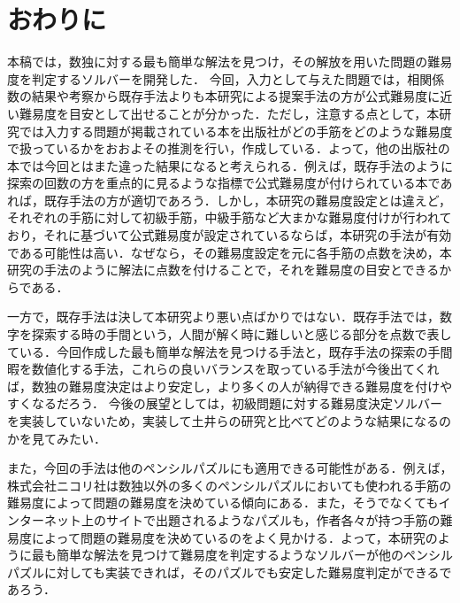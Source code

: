 \documentclass[submit,techrep,noauthor]{ipsj}
\begin{document}
\section{おわりに}
本稿では，数独に対する最も簡単な解法を見つけ，その解放を用いた問題の難易度を判定するソルバーを開発した．
今回，入力として与えた問題では，相関係数の結果や考察から既存手法よりも本研究による提案手法の方が公式難易度に近い難易度を目安として出せることが分かった．ただし，注意する点として，本研究では入力する問題が掲載されている本を出版社がどの手筋をどのような難易度で扱っているかをおおよその推測を行い，作成している．よって，他の出版社の本では今回とはまた違った結果になると考えられる．例えば，既存手法のように探索の回数の方を重点的に見るような指標で公式難易度が付けられている本であれば，既存手法の方が適切であろう．しかし，本研究の難易度設定とは違えど，それぞれの手筋に対して初級手筋，中級手筋など大まかな難易度付けが行われており，それに基づいて公式難易度が設定されているならば，本研究の手法が有効である可能性は高い．なぜなら，その難易度設定を元に各手筋の点数を決め，本研究の手法のように解法に点数を付けることで，それを難易度の目安とできるからである．

一方で，既存手法は決して本研究より悪い点ばかりではない．既存手法では，数字を探索する時の手間という，人間が解く時に難しいと感じる部分を点数で表している．今回作成した最も簡単な解法を見つける手法と，既存手法の探索の手間暇を数値化する手法，これらの良いバランスを取っている手法が今後出てくれば，数独の難易度決定はより安定し，より多くの人が納得できる難易度を付けやすくなるだろう．
今後の展望としては，初級問題に対する難易度決定ソルバーを実装していないため，実装して土井らの研究と比べてどのような結果になるのかを見てみたい．

また，今回の手法は他のペンシルパズルにも適用できる可能性がある．例えば，株式会社ニコリ社は数独以外の多くのペンシルパズルにおいても使われる手筋の難易度によって問題の難易度を決めている傾向にある．また，そうでなくてもインターネット上のサイトで出題されるようなパズルも，作者各々が持つ手筋の難易度によって問題の難易度を決めているのをよく見かける．よって，本研究のように最も簡単な解法を見つけて難易度を判定するようなソルバーが他のペンシルパズルに対しても実装できれば，そのパズルでも安定した難易度判定ができるであろう．





\end{document}
